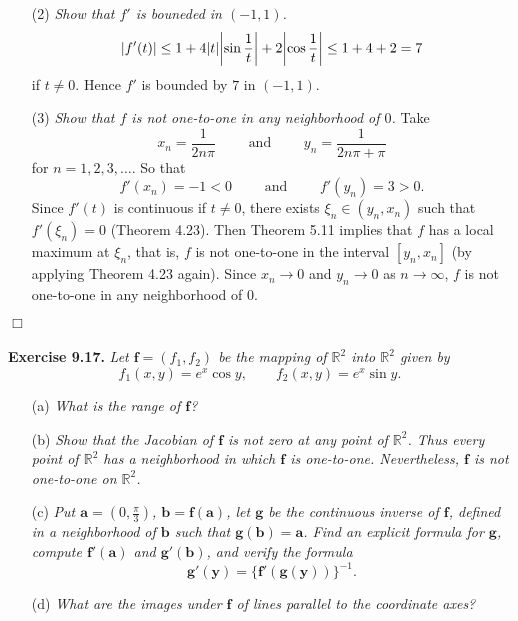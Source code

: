\documentclass{article}
\begin{document}
\begin{enumerate}
\item[(2)]
  \emph{Show that $f'$ is bouneded in $(-1,1)$.}
  \[
    \abs{f'(t)}
    \leq 1 + 4\abs{t}\abs{\sin\frac{1}{t}} + 2\abs{\cos\frac{1}{t}}
    \leq 1 + 4 + 2
    = 7
  \]
  if $t \neq 0$.
  Hence $f'$ is bounded by $7$ in $(-1,1)$.

\item[(3)]
  \emph{Show that $f$ is not one-to-one in any neighborhood of $0$.}
  Take
  \[
    x_n = \frac{1}{2n\pi}
    \qquad
    \text{ and }
    \qquad
    y_n = \frac{1}{2n\pi+\pi}
  \]
  for $n = 1,2,3,\ldots$.
  So that
  \[
    f'(x_n) = -1 < 0
    \qquad
    \text{ and }
    \qquad
    f'(y_n) = 3 > 0.
  \]
  Since $f'(t)$ is continuous if $t \neq 0$,
  there exists $\xi_n \in (y_n, x_n)$ such that $f'(\xi_n) = 0$ (Theorem 4.23).
  Then Theorem 5.11 implies that $f$ has a local maximum at $\xi_n$,
  that is, $f$ is not one-to-one in the interval $[y_n, x_n]$
  (by applying Theorem 4.23 again).
  Since $x_n \to 0$ and $y_n \to 0$ as $n \to \infty$,
  $f$ is not one-to-one in any neighborhood of $0$.
\end{enumerate}
$\Box$ \\\\






\textbf{Exercise 9.17.}
\emph{Let $\mathbf{f} = (f_1,f_2)$ be the mapping of $\mathbb{R}^2$ into $\mathbb{R}^2$
given by}
\[
  f_1(x,y) = e^x \cos y,
  \qquad
  f_2(x,y) = e^x \sin y.
\]
\begin{enumerate}
\item[(a)]
  \emph{What is the range of $\mathbf{f}$?}

\item[(b)]
  \emph{Show that the Jacobian of $\mathbf{f}$ is not zero at any point of $\mathbb{R}^2$.
  Thus every point of $\mathbb{R}^2$ has a neighborhood in which $\mathbf{f}$ is one-to-one.
  Nevertheless, $\mathbf{f}$ is not one-to-one on $\mathbb{R}^2$.}

\item[(c)]
  \emph{Put $\mathbf{a} = \left(0, \frac{\pi}{3}\right)$,
  $\mathbf{b} = \mathbf{f}(\mathbf{a})$, let $\mathbf{g}$ be the continuous inverse of $\mathbf{f}$,
  defined in a neighborhood of $\mathbf{b}$ such that $\mathbf{g}(\mathbf{b}) = \mathbf{a}$.
  Find an explicit formula for $\mathbf{g}$,
  compute $\mathbf{f}'(\mathbf{a})$ and $\mathbf{g}'(\mathbf{b})$,
  and verify the formula}
  \[
    \mathbf{g}'(\mathbf{y})
    = \{ \mathbf{f}'(\mathbf{g}(\mathbf{y})) \}^{-1}.
  \]

\item[(d)]
  \emph{What are the images under $\mathbf{f}$ of lines parallel to the coordinate axes?} \\
\end{enumerate}
\end{document}

